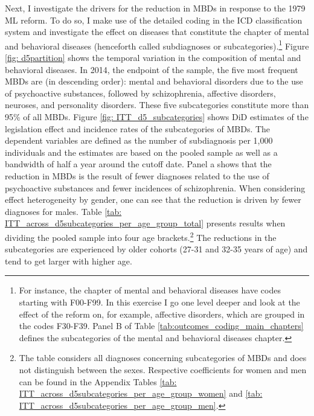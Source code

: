 \documentclass[11pt, a4paper, draft]{article} %
\begin{document}
Next, I investigate the drivers for the reduction in MBDs in response to the 1979 ML reform. To do so, I make use of the detailed coding in the ICD classification system and investigate the effect on diseases that constitute the chapter of mental and behavioral diseases (henceforth called subdiagnoses or subcategories).\footnote{For instance, the chapter of mental and behavioral diseases have codes starting with F00-F99. In this exercise I go one level deeper and look at the effect of the reform on, for example, affective disorders, which are grouped in the codes F30-F39. Panel B of Table \ref{tab:outcomes_coding_main_chapters} defines the subcategories of the mental and behavioral diseases chapter.} Figure \ref{fig: d5partition} shows the temporal variation in the composition of mental and behavioral diseases. In 2014, the endpoint of the sample, the five most frequent MBDs are (in descending order): mental and behavioral disorders due to the use of psychoactive substances, followed by schizophrenia, affective disorders, neuroses, and personality disorders. These five subcategories constitute more than 95\% of all MBDs. Figure \ref{fig: ITT_d5_subcategories} shows DiD estimates of the legislation effect and incidence rates of the subcategories of MBDs. The dependent variables are defined as the number of subdiagnosis per 1,000 individuals and the estimates are based on the pooled sample as well as a bandwidth of half a year around the cutoff date. Panel a shows that the reduction in MBDs is the result of fewer diagnoses related to the use of psychoactive substances and fewer incidences of schizophrenia. When considering effect heterogeneity by gender, one can see that the reduction is driven by fewer diagnoses for males. Table \ref{tab: ITT_across_d5subcategories_per_age_group_total} presents results when dividing the pooled sample into four age brackets.\footnote{The table considers all diagnoses concerning subcategories of MBDs and does not distinguish between the sexes. Respective coefficients for women and men can be found in the Appendix Tables \ref{tab: ITT_across_d5subcategories_per_age_group_women} and \ref{tab: ITT_across_d5subcategories_per_age_group_men}.} The reductions in the subcategories are experienced by older cohorts (27-31 and 32-35 years of age) and tend to get larger with higher age.
\end{document}
